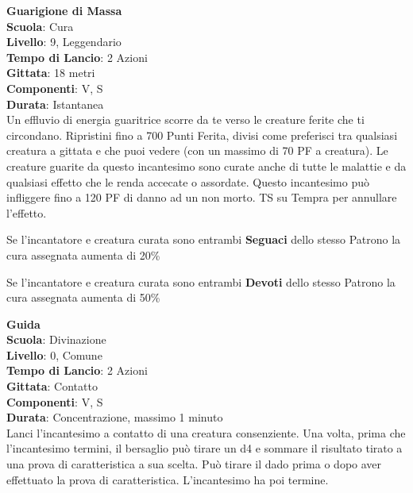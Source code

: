 \begin{multicols}{2}
\medskip\textbf{Guarigione di Massa}\\
\textbf{Scuola}: Cura\\
\textbf{Livello}: 9, Leggendario\\
\textbf{Tempo di Lancio}: 2 Azioni\\
\textbf{Gittata}: 18 metri\\
\textbf{Componenti}: V, S\\
\textbf{Durata}: Istantanea\\
Un effluvio di energia guaritrice scorre da te verso le creature ferite che ti circondano. Ripristini fino a 700 Punti Ferita, divisi come preferisci tra qualsiasi creatura a gittata e che puoi vedere (con un massimo di 70 PF a creatura). Le creature guarite da questo incantesimo sono curate anche di tutte le malattie e da qualsiasi effetto che le renda accecate o assordate. Questo incantesimo può infliggere fino a 120 PF di danno ad un non morto. TS su Tempra per annullare l'effetto.

Se l'incantatore e creatura curata sono entrambi \textbf{Seguaci} dello stesso Patrono la cura assegnata aumenta di 20\%

Se l'incantatore e creatura curata sono entrambi \textbf{Devoti} dello stesso Patrono la cura assegnata aumenta di 50\%

\medskip\textbf{Guida}\\
\textbf{Scuola}: Divinazione\\
\textbf{Livello}: 0, Comune\\
\textbf{Tempo di Lancio}: 2 Azioni\\
\textbf{Gittata}: Contatto\\
\textbf{Componenti}: V, S\\
\textbf{Durata}: Concentrazione, massimo 1 minuto\\
Lanci l'incantesimo a contatto di una creatura consenziente. Una volta, prima che l'incantesimo termini, il bersaglio può tirare un d4 e sommare il risultato tirato a una prova di caratteristica a sua scelta. Può tirare il dado prima o dopo aver effettuato la prova di caratteristica. L'incantesimo ha poi termine.


\end{multicols}
